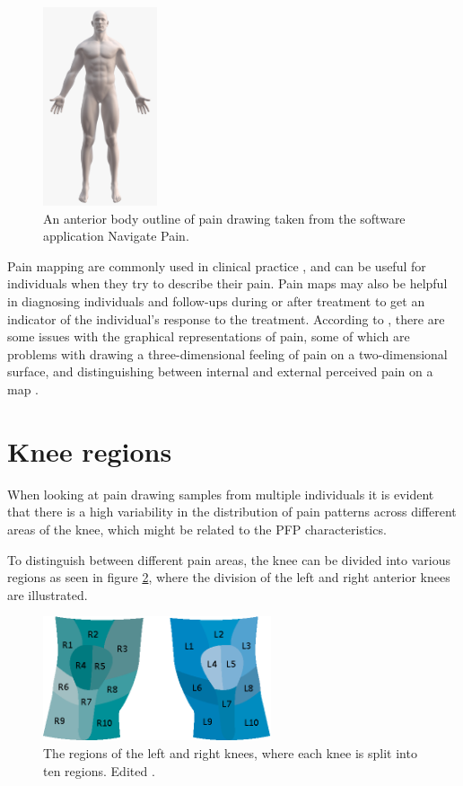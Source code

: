 \begin{figure} [H]
\centering
\includegraphics[width=0.3\textwidth]{figures/painmap}
\caption{An anterior body outline of pain drawing taken from the software application Navigate Pain.}
\label{fig:painmap}
\end{figure}

\noindent
Pain mapping are commonly used in clinical practice \citep{Schott2010}, and can be useful for individuals when they try to describe their pain. Pain maps may also be helpful in diagnosing individuals and follow-ups during or after treatment to get an indicator of the individual's response to the treatment.\citep{Boudreau2016}
According to \citeauthor{Schott2010}, there are some issues with the graphical representations of pain, some of which are problems with drawing a three-dimensional feeling of pain on a two-dimensional surface, and distinguishing between internal and external perceived pain on a map \citep{Schott2010}.

\section{Knee regions}
When looking at pain drawing samples from multiple individuals it is evident that there is a high variability in the distribution of pain patterns across different areas of the knee, which might be related to the PFP characteristics.

\noindent
To distinguish between different pain areas, the knee can be divided into various regions as seen in figure \ref{fig:atlas}, where the division of the left and right anterior knees are illustrated. 

\begin{figure} [H] 
\centering
\includegraphics[width=0.6\textwidth]{figures/atlas}
\caption{The regions of the left and right knees, where each knee is split into ten regions. Edited \citep{Elson2010}.}
\label{fig:atlas}
\end{figure}

